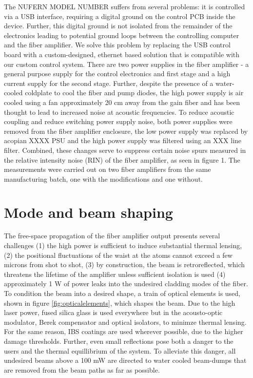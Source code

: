 \documentclass[twocolumn,aps,pra,showpacs,preprintnumbers,bibnotes]{revtex4-1}
\begin{document}
The NUFERN MODEL NUMBER suffers from several problems: it is controlled via a USB interface, requiring a digital ground on the control PCB inside the device. Further, this digital ground is not isolated from the remainder of the electronics leading to potential ground loops between the controlling computer and the fiber amplifier. 
We solve this problem by replacing the USB control board with a custom-designed, ethernet based solution that is compatible with our custom control system. 
There are two power supplies in the fiber amplifier - a general purpose supply for the control electronics and first stage and a high current supply for the second stage. 
Further, despite the presence of a water-cooled coldplate to cool the fiber and pump diodes, the high power supply is air cooled using a fan approximately 20 cm away from the gain fiber and has been thought to lead to increased noise at acoustic frequencies.
To reduce acoustic coupling and reduce switching power supply noise, both power supplies were removed from the fiber amplifier enclosure, the low power supply was replaced by acopian XXXX PSU and the high power supply was filtered using an XXX line filter.
Combined, these changes serve to suppress certain noise spurs measured in the relative intensity noise (RIN) of the fiber amplifier, as seen in figure 1. 
The measurements were carried out on two fiber amplifiers from the same manufacturing batch, one with the modifications and one without.


\section{Mode and beam shaping}
The free-space propagation of the fiber amplifier output presents several challenges (1) the high power is sufficient to induce substantial thermal lensing, (2) the positional fluctuations of the waist at the atoms cannot exceed 
a few microns from shot to shot, (3) by construction, the beam is retroreflected, which threatens the lifetime of the amplifier unless sufficient isolation is used (4) approximately 1 W of power leaks into the undesired cladding modes of the fiber. 
To condition the beam into a desired shape, a train of optical elements is used, shown in figure \ref{fig:opticalelements}, which shapes the beam. 
Due to the high laser power, fused silica glass is used everywhere but in the acousto-optic modulator, Berek compensator and optical isolators, to minimze thermal lensing.
For the same reason, IBS coatings are used wherever possible, due to the higher damage thresholds.
Further, even small reflections pose both a danger to the users and the thermal equillibrium of the system.
To alleviate this danger, all undesired beams above a 100 mW are directed to water cooled beam-dumps that are removed from the beam paths as far as possible.
\end{document}
